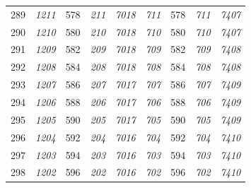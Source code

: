 \documentclass[10pt,fleqn]{article}
\begin{document}
\begin{longtable}{c|cccccccc}
289 & {\color{blue} \it 1211 \rm} & {\color{black} 578} & {\color{blue} \it 211 \rm} & {\color{blue} \it 7018 \rm} & {\color{blue} \it 711 \rm} & {\color{black} 578} & {\color{blue} \it 711 \rm} & {\color{blue} \it 7407 \rm} \\
290 & {\color{blue} \it 1210 \rm} & {\color{black} 580} & {\color{blue} \it 210 \rm} & {\color{blue} \it 7018 \rm} & {\color{blue} \it 710 \rm} & {\color{black} 580} & {\color{blue} \it 710 \rm} & {\color{blue} \it 7407 \rm} \\
291 & {\color{blue} \it 1209 \rm} & {\color{black} 582} & {\color{blue} \it 209 \rm} & {\color{blue} \it 7018 \rm} & {\color{blue} \it 709 \rm} & {\color{black} 582} & {\color{blue} \it 709 \rm} & {\color{blue} \it 7408 \rm} \\
292 & {\color{blue} \it 1208 \rm} & {\color{black} 584} & {\color{blue} \it 208 \rm} & {\color{blue} \it 7018 \rm} & {\color{blue} \it 708 \rm} & {\color{black} 584} & {\color{blue} \it 708 \rm} & {\color{blue} \it 7408 \rm} \\
293 & {\color{blue} \it 1207 \rm} & {\color{black} 586} & {\color{blue} \it 207 \rm} & {\color{blue} \it 7017 \rm} & {\color{blue} \it 707 \rm} & {\color{black} 586} & {\color{blue} \it 707 \rm} & {\color{blue} \it 7409 \rm} \\
294 & {\color{blue} \it 1206 \rm} & {\color{black} 588} & {\color{blue} \it 206 \rm} & {\color{blue} \it 7017 \rm} & {\color{blue} \it 706 \rm} & {\color{black} 588} & {\color{blue} \it 706 \rm} & {\color{blue} \it 7409 \rm} \\
295 & {\color{blue} \it 1205 \rm} & {\color{black} 590} & {\color{blue} \it 205 \rm} & {\color{blue} \it 7017 \rm} & {\color{blue} \it 705 \rm} & {\color{black} 590} & {\color{blue} \it 705 \rm} & {\color{blue} \it 7409 \rm} \\
296 & {\color{blue} \it 1204 \rm} & {\color{black} 592} & {\color{blue} \it 204 \rm} & {\color{blue} \it 7016 \rm} & {\color{blue} \it 704 \rm} & {\color{black} 592} & {\color{blue} \it 704 \rm} & {\color{blue} \it 7410 \rm} \\
297 & {\color{blue} \it 1203 \rm} & {\color{black} 594} & {\color{blue} \it 203 \rm} & {\color{blue} \it 7016 \rm} & {\color{blue} \it 703 \rm} & {\color{black} 594} & {\color{blue} \it 703 \rm} & {\color{blue} \it 7410 \rm} \\
298 & {\color{blue} \it 1202 \rm} & {\color{black} 596} & {\color{blue} \it 202 \rm} & {\color{blue} \it 7016 \rm} & {\color{blue} \it 702 \rm} & {\color{black} 596} & {\color{blue} \it 702 \rm} & {\color{blue} \it 7410 \rm} \\

\end{longtable}
\end{document}
